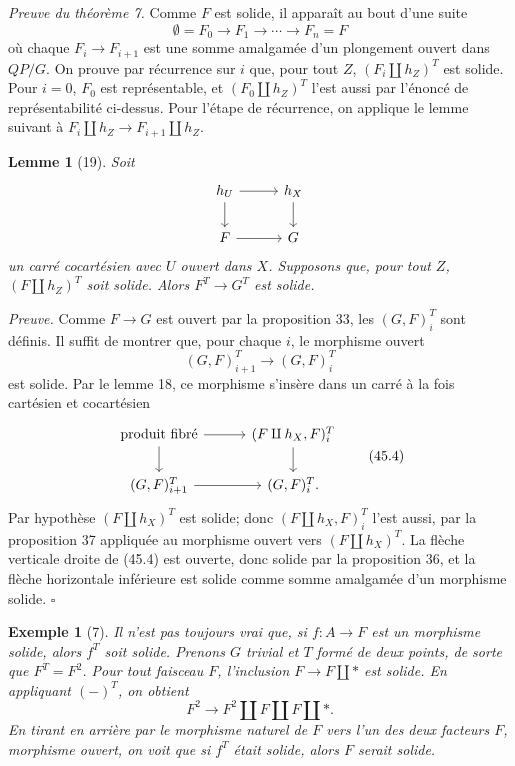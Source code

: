 \documentclass[11pt]{article}
\newcommand{\pt}{*}
\theoremstyle{deligne}
\newtheorem*{lemma*}{Lemme}
\newtheorem*{example*}{Exemple}
\newenvironment{proofdel}{\noindent\textit{Preuve.}}{\hfill$\square$}
\newenvironment{proofnamed}[1]{\noindent\textit{#1.}}{}
\begin{document}
\begin{proofnamed}{Preuve du théorème 7}
Comme \(F\) est solide, il apparaît au bout d'une suite
\[
\emptyset=F_0\to F_1\to\cdots\to F_n=F
\]
où chaque \(F_i\to F_{i+1}\) est une somme amalgamée d'un plongement ouvert dans \(QP/G\). On prouve par récurrence sur \(i\) que, pour tout \(Z\), \((F_i\amalg h_Z)^T\) est solide. Pour \(i=0\), \(F_0\) est représentable, et \((F_0\amalg h_Z)^T\) l'est aussi par l'énoncé de représentabilité ci-dessus. Pour l'étape de récurrence, on applique le lemme suivant à \(F_i\amalg h_Z\to F_{i+1}\amalg h_Z\).
\end{proofnamed}

\begin{lemma*}[19]
Soit
\[
\begin{tikzcd}[column sep=2.8em,row sep=1.8em]
h_U \arrow[r] \arrow[d] & h_X \arrow[d]\\
F \arrow[r] & G
\end{tikzcd}
\]
un carré cocartésien avec \(U\) ouvert dans \(X\). Supposons que, pour tout \(Z\), \((F\amalg h_Z)^T\) soit solide. Alors \(F^T\to G^T\) est solide.
\end{lemma*}

\begin{proofdel}
Comme \(F\to G\) est ouvert par la proposition 33, les \((G,F)^T_i\) sont définis. Il suffit de montrer que, pour chaque \(i\), le morphisme ouvert
\[
(G,F)^T_{i+1}\longrightarrow (G,F)^T_i
\]
est solide. Par le lemme 18, ce morphisme s'insère dans un carré à la fois cartésien et cocartésien
\[
\begin{tikzcd}[column sep=3.0em,row sep=1.8em]
\text{produit fibré} \arrow[r] \arrow[d] &
(F\amalg h_X,F)^T_i \arrow[d]\\
(G,F)^T_{i+1} \arrow[r] &
(G,F)^T_i .
\end{tikzcd}
\tag{45.4}
\]
Par hypothèse \((F\amalg h_X)^T\) est solide; donc \((F\amalg h_X,F)^T_i\) l'est aussi, par la proposition 37 appliquée au morphisme ouvert vers \((F\amalg h_X)^T\). La flèche verticale droite de (45.4) est ouverte, donc solide par la proposition 36, et la flèche horizontale inférieure est solide comme somme amalgamée d'un morphisme solide.
\end{proofdel}

\begin{example*}[7]
Il n'est pas toujours vrai que, si \(f:A\to F\) est un morphisme solide, alors \(f^T\) soit solide. Prenons \(G\) trivial et \(T\) formé de deux points, de sorte que \(F^T=F^2\). Pour tout faisceau \(F\), l'inclusion \(F\to F\amalg\pt\) est solide. En appliquant \((-)^T\), on obtient
\[
F^2\longrightarrow F^2\amalg F\amalg F\amalg \pt .
\]
En tirant en arrière par le morphisme naturel de \(F\) vers l'un des deux facteurs \(F\), morphisme ouvert, on voit que si \(f^T\) était solide, alors \(F\) serait solide.
\end{example*}
\end{document}
